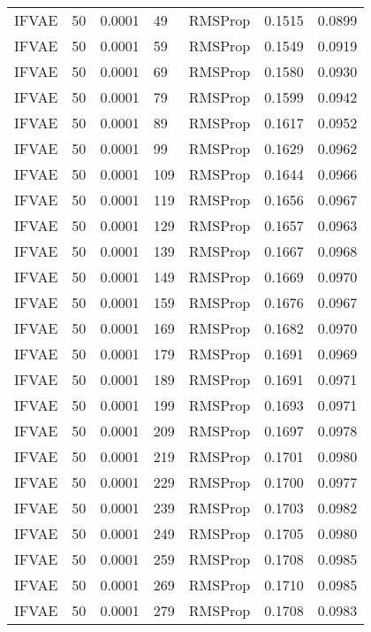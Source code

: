 \begin{tabular}{llrllrr}
 IFVAE &   50 &  0.0001 &    49 &   RMSProp &  0.1515 &       0.0899 \\
 IFVAE &   50 &  0.0001 &    59 &   RMSProp &  0.1549 &       0.0919 \\
 IFVAE &   50 &  0.0001 &    69 &   RMSProp &  0.1580 &       0.0930 \\
 IFVAE &   50 &  0.0001 &    79 &   RMSProp &  0.1599 &       0.0942 \\
 IFVAE &   50 &  0.0001 &    89 &   RMSProp &  0.1617 &       0.0952 \\
 IFVAE &   50 &  0.0001 &    99 &   RMSProp &  0.1629 &       0.0962 \\
 IFVAE &   50 &  0.0001 &   109 &   RMSProp &  0.1644 &       0.0966 \\
 IFVAE &   50 &  0.0001 &   119 &   RMSProp &  0.1656 &       0.0967 \\
 IFVAE &   50 &  0.0001 &   129 &   RMSProp &  0.1657 &       0.0963 \\
 IFVAE &   50 &  0.0001 &   139 &   RMSProp &  0.1667 &       0.0968 \\
 IFVAE &   50 &  0.0001 &   149 &   RMSProp &  0.1669 &       0.0970 \\
 IFVAE &   50 &  0.0001 &   159 &   RMSProp &  0.1676 &       0.0967 \\
 IFVAE &   50 &  0.0001 &   169 &   RMSProp &  0.1682 &       0.0970 \\
 IFVAE &   50 &  0.0001 &   179 &   RMSProp &  0.1691 &       0.0969 \\
 IFVAE &   50 &  0.0001 &   189 &   RMSProp &  0.1691 &       0.0971 \\
 IFVAE &   50 &  0.0001 &   199 &   RMSProp &  0.1693 &       0.0971 \\
 IFVAE &   50 &  0.0001 &   209 &   RMSProp &  0.1697 &       0.0978 \\
 IFVAE &   50 &  0.0001 &   219 &   RMSProp &  0.1701 &       0.0980 \\
 IFVAE &   50 &  0.0001 &   229 &   RMSProp &  0.1700 &       0.0977 \\
 IFVAE &   50 &  0.0001 &   239 &   RMSProp &  0.1703 &       0.0982 \\
 IFVAE &   50 &  0.0001 &   249 &   RMSProp &  0.1705 &       0.0980 \\
 IFVAE &   50 &  0.0001 &   259 &   RMSProp &  0.1708 &       0.0985 \\
 IFVAE &   50 &  0.0001 &   269 &   RMSProp &  0.1710 &       0.0985 \\
 IFVAE &   50 &  0.0001 &   279 &   RMSProp &  0.1708 &       0.0983 \\

\end{tabular}
